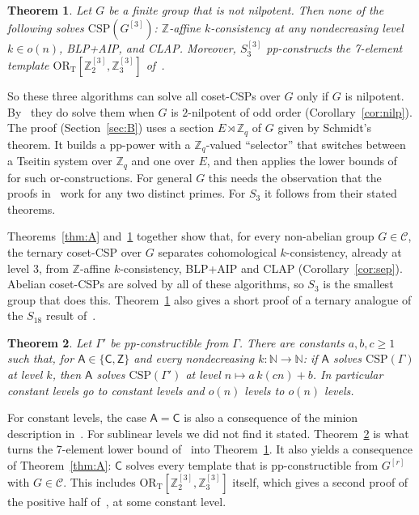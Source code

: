 \documentclass[11pt]{article}
\newtheorem{mainthm}{Theorem}
\theoremstyle{definition}
\theoremstyle{remark}
\newcommand{\Csp}{\mathrm{CSP}}
\newcommand{\Coh}{\mathsf{C}}
\newcommand{\Aff}{\mathsf{Z}}
\newcommand{\Z}{\mathbb Z}
\newcommand{\ORT}{\mathrm{OR}_{\mathrm T}}
\begin{document}
\begin{mainthm}\label{thm:B}
Let $G$ be a finite group that is not nilpotent. Then none of the following
solves $\Csp(G^{[3]})$: $\Z$-affine $k$-consistency at any nondecreasing level
$k\in o(n)$, BLP+AIP, and CLAP. Moreover, $S_3^{[3]}$ pp-constructs the
7-element template $\ORT[\Z_2^{[3]},\Z_3^{[3]}]$ of~\cite{LP25}.
\end{mainthm}

So these three algorithms can solve all coset-CSPs over $G$ only if $G$ is
nilpotent. By~\cite{LP25} they do solve them when $G$ is $2$-nilpotent of odd
order (Corollary~\ref{cor:nilp}). The proof (Section~\ref{sec:B}) uses a section
$E\rtimes\Z_q$ of $G$ given by Schmidt's theorem. It builds a pp-power with a
$\Z_q$-valued ``selector'' that switches between a Tseitin system over $\Z_q$ and
one over $E$, and then applies the lower bounds of~\cite{LP25} for such
or-constructions. For general $G$ this needs the observation that the proofs
in~\cite{LP25} work for any two distinct primes. For $S_3$ it follows from their
stated theorems.

Theorems~\ref{thm:A} and~\ref{thm:B} together show that, for every non-abelian
group $G\in\mathcal C$, the ternary coset-CSP over $G$ separates cohomological
$k$-consistency, already at level $3$, from $\Z$-affine $k$-consistency, BLP+AIP and
CLAP (Corollary~\ref{cor:sep}). Abelian coset-CSPs are solved by all of these
algorithms, so $S_3$ is the smallest group that does this. Theorem~\ref{thm:B}
also gives a short proof of a ternary analogue of the $S_{18}$ result
of~\cite{LP25}.

\begin{mainthm}\label{thm:C}
Let $\Gamma'$ be pp-constructible from $\Gamma$. There are constants $a,b,c\ge1$
such that, for $\mathsf A\in\{\Coh,\Aff\}$ and every nondecreasing
$k\colon\mathbb N\to\mathbb N$: if $\mathsf A$ solves $\Csp(\Gamma)$ at level
$k$, then $\mathsf A$ solves $\Csp(\Gamma')$ at level $n\mapsto a\,k(cn)+b$. In
particular constant levels go to constant levels and $o(n)$ levels to $o(n)$
levels.
\end{mainthm}

For constant levels, the case $\mathsf A=\Coh$ is also a consequence of the
minion description in~\cite{BHZ26}. For sublinear levels we did not find it
stated. Theorem~\ref{thm:C} is what turns the 7-element lower bound
of~\cite{LP25} into Theorem~\ref{thm:B}. It also yields a consequence of
Theorem~\ref{thm:A}: $\Coh$ solves every template that is pp-constructible from
$G^{[r]}$ with $G\in\mathcal C$. This includes $\ORT[\Z_2^{[3]},\Z_3^{[3]}]$
itself, which gives a second proof of the positive half
of~\cite[Thm.~1.3]{LP25}, at some constant level.
\end{document}
